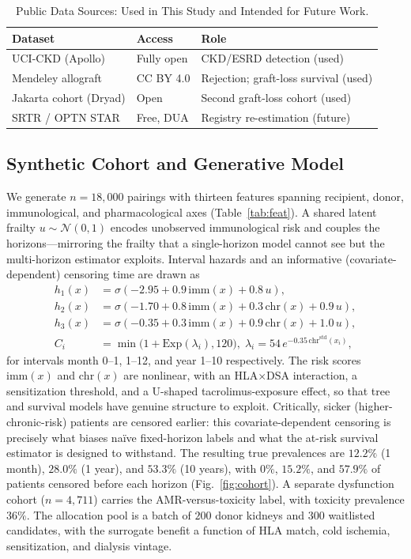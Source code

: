 \documentclass[journal]{IEEEtran}
\begin{document}
\begin{table}[!t]
\centering
\caption{Public Data Sources: Used in This Study and Intended for Future Work.}
\label{tab:data}
\begin{tabular}{@{}p{2.1cm}p{1.8cm}p{2.9cm}@{}}
\toprule
Dataset & Access & Role \\
\midrule
UCI-CKD (Apollo) & Fully open & CKD/ESRD detection (used) \\
Mendeley allograft & CC BY 4.0 & Rejection; graft-loss survival (used) \\
Jakarta cohort (Dryad) & Open & Second graft-loss cohort (used) \\
SRTR / OPTN STAR & Free, DUA & Registry re-estimation (future) \\
\bottomrule
\end{tabular}
\end{table}

\subsection{Synthetic Cohort and Generative Model}
We generate $n=18{,}000$ pairings with thirteen features spanning recipient, donor, immunological, and pharmacological axes (Table~\ref{tab:feat}). A shared latent frailty $u\sim\mathcal{N}(0,1)$ encodes unobserved immunological risk and couples the horizons---mirroring the frailty that a single-horizon model cannot see but the multi-horizon estimator exploits. Interval hazards and an informative (covariate-dependent) censoring time are drawn as
\begin{align}
h_1(x)&=\sigma(-2.95+0.9\,\mathrm{imm}(x)+0.8\,u),\\
h_2(x)&=\sigma(-1.70+0.8\,\mathrm{imm}(x)+0.3\,\mathrm{chr}(x)+0.9\,u),\\
h_3(x)&=\sigma(-0.35+0.3\,\mathrm{imm}(x)+0.9\,\mathrm{chr}(x)+1.0\,u),\\
C_i&=\min\!\big(1+\mathrm{Exp}(\lambda_i),120\big),\;\lambda_i=54\,e^{-0.35\,\mathrm{chr}^{\mathrm{std}}(x_i)},
\end{align}
for intervals month 0--1, 1--12, and year 1--10 respectively. The risk scores $\mathrm{imm}(x)$ and $\mathrm{chr}(x)$ are nonlinear, with an HLA$\times$DSA interaction, a sensitization threshold, and a U-shaped tacrolimus-exposure effect, so that tree and survival models have genuine structure to exploit. Critically, sicker (higher-chronic-risk) patients are censored earlier: this covariate-dependent censoring is precisely what biases na\"ive fixed-horizon labels and what the at-risk survival estimator is designed to withstand. The resulting true prevalences are $12.2\%$ (1 month), $28.0\%$ (1 year), and $53.3\%$ (10 years), with $0\%$, $15.2\%$, and $57.9\%$ of patients censored before each horizon (Fig.~\ref{fig:cohort}). A separate dysfunction cohort ($n=4{,}711$) carries the AMR-versus-toxicity label, with toxicity prevalence $36\%$. The allocation pool is a batch of $200$ donor kidneys and $300$ waitlisted candidates, with the surrogate benefit a function of HLA match, cold ischemia, sensitization, and dialysis vintage.
\end{document}
